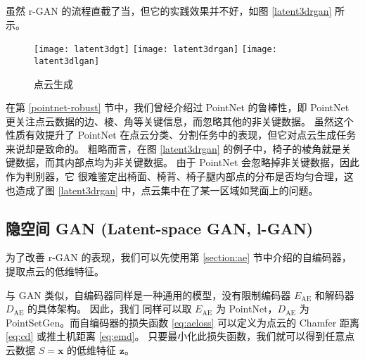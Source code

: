 虽然 r-GAN 的流程直截了当，但它的实践效果并不好，如图 \ref{latent3drgan} 所示。
\begin{figure}[h]
	\centering%
	{\texttt{[image: latent3dgt]}}%
	\hspace{.5em}%
	{\texttt{[image: latent3drgan]}}%
	\hspace{.5em}%
	{\texttt{[image: latent3dlgan]}}%
	\caption{点云生成 \cite{latentpc}}
\end{figure}
在第 \ref{pointnet-robust} 节中，我们曾经介绍过 PointNet 的鲁棒性，即 PointNet 更关注点云数据的边、棱、角等关键信息，而忽略其他的非关键数据。
虽然这个性质有效提升了 PointNet 在点云分类、分割任务中的表现，但它对点云生成任务来说却是致命的。
粗略而言，在图 \ref{latent3drgan} 的例子中，椅子的棱角就是关键数据，而其内部点均为非关键数据。
由于 PointNet 会忽略掉非关键数据，因此作为判别器，它 %
很难鉴定出椅面、椅背、椅子腿内部点的分布是否均匀合理，这也造成了图 \ref{latent3drgan} 中，点云集中在了某一区域如凳面上的问题。

\subsection{隐空间 GAN (Latent-space GAN, l-GAN)}
为了改善 r-GAN 的表现，我们可以先使用第 \ref{section:ae} 节中介绍的自编码器，提取点云的低维特征。

与 GAN 类似，自编码器同样是一种通用的模型，没有限制编码器 $E_{\text{AE}}$ 和解码器 $D_{\text{AE}}$ 的具体架构。
因此，我们%
同样可以取 $E_{\text{AE}}$ 为 PointNet，$D_{\text{AE}}$ 为 PointSetGen。而自编码器的损失函数 \eqref{eq:aeloss} 可以定义为点云的 Chamfer 距离 \eqref{eq:cd} 或推土机距离 \eqref{eq:emd}。
只要最小化此损失函数，我们就可以得到任意点云数据 $S = \bm x$ 的低维特征 $\bm z$。


